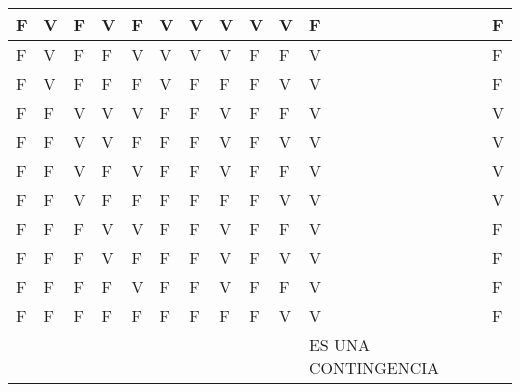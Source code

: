 \documentclass{article}
\begin{document}
\begin{center}
\begin{tabular}{|o|o|o|o|o|o|o|o|o|o|o|o|}
    F & V & F & V & F & V & V & V & V & V & F & F\\ \hline
    F & V & F & F & V & V & V & V & F & F & V & F\\ \hline
    F & V & F & F & F & V & F & F & F & V & V & F\\ \hline
    F & F & V & V & V & F & F & V & F & F & V & V\\ \hline
    F & F & V & V & F & F & F & V & F & V & V & V\\ \hline
    F & F & V & F & V & F & F & V & F & F & V & V\\ \hline
    F & F & V & F & F & F & F & F & F & V & V & V\\ \hline
    F & F & F & V & V & F & F & V & F & F & V & F\\ \hline
    F & F & F & V & F & F & F & V & F & V & V & F\\ \hline
    F & F & F & F & V & F & F & V & F & F & V & F\\ \hline
    F & F & F & F & F & F & F & F & F & V & V & F\\ \hline
    & & & & & & & & & & ES UNA CONTINGENCIA &\\ \hline
    
  \end{tabular}
\end{center}
\end{document}
